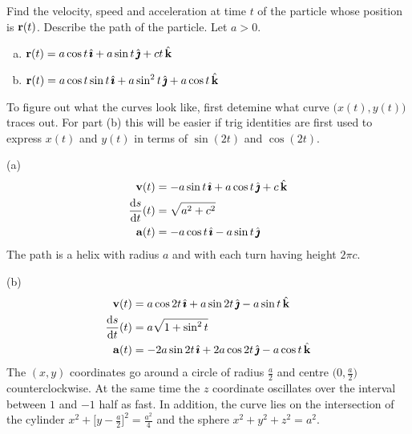 \begin{question}
Find the velocity, speed and acceleration at time $t$ of
the particle whose position is $\mathbf{r}(t)$. Describe the path of the particle.
Let $a>0$.
\begin{enumerate}[(a)]
\item
$\mathbf{r}(t)= a \cos t\,\hat{\pmb{\imath}} + a\sin t\,\hat{\pmb{\jmath}} + ct\,\hat{\mathbf{k}}$
\item
$\mathbf{r}(t)= a \cos t\sin t\,\hat{\pmb{\imath}} + a\sin^2 t\,\hat{\pmb{\jmath}} + a\cos t\,\hat{\mathbf{k}}$
\end{enumerate}
\end{question}

\begin{hint}
To figure out what the curves look like, first detemine what curve
$\big(x(t),y(t)\big)$ traces out. For part (b) this will be easier
if trig identities are first used to express $x(t)$ and $y(t)$ in terms of
$\sin(2t)$ and $\cos(2t)$.
\end{hint}

\begin{answer}
(a) 
\begin{align*}
\vv(t)&= -a \sin t\,\hi+a\cos t\,\hj+c\,\hk\\
\diff{s}{t}(t)&= \sqrt{a^2+c^2}\\
\va(t)&= -a \cos t\,\hi-a\sin t\,\hj
\end{align*}
The path is a helix with radius $a$ and with each turn having height $2\pi c$.

(b)
\begin{align*}
\vv(t)&= a \cos 2t\,\hi +a\sin 2t\,\hj-a\sin t\,\hk\\
\diff{s}{t}(t)&= a\sqrt{1+\sin^2t}\\
\va(t)&= -2a \sin 2t\,\hi +2a\cos 2t\,\hj-a\cos t\,\hk
\end{align*}
The $(x,y)$ coordinates go around a circle of radius $\frac{a}{2}$ and
centre $\big(0,\frac{a}{2}\big)$ counterclockwise. At the same time the $z$ coordinate oscillates over the interval between $1$ and $-1$ half as fast. In addition, the curve lies on 
the intersection of the cylinder $x^2+\big[y-\tfrac{a}{2}\big]^2=\tfrac{a^2}{4}$ and the sphere $x^2+y^2+z^2=a^2$. 
\end{answer}

